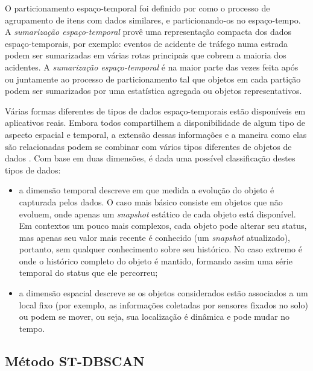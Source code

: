 O particionamento espaço-temporal foi definido por \cite{shekharetal2015} como o processo de agrupamento de itens com dados similares, e particionando-os no espaço-tempo. A \emph{sumarização espaço-temporal} provê uma representação compacta dos dados espaço-temporais, por exemplo: eventos de acidente de tráfego numa estrada podem ser sumarizadas em várias rotas principais que cobrem a maioria dos acidentes. A \emph{sumarização espaço-temporal} é na maior parte das vezes feita após ou juntamente ao processo de particionamento tal que objetos em cada partição podem ser sumarizados por uma estatística agregada ou objetos representativos.

Várias formas diferentes de tipos de dados espaço-temporais estão disponíveis em aplicativos reais. Embora todos compartilhem a disponibilidade de algum tipo de aspecto espacial e temporal, a extensão dessas informações e a maneira como elas são relacionadas podem se combinar com vários tipos diferentes de objetos de dados \cite{Kisilevich2009}. Com base em duas dimensões, é dada uma possível classificação destes tipos de dados:

\begin{itemize}
	\item a dimensão temporal descreve em que medida a evolução do objeto é capturada pelos dados. O caso mais básico consiste em objetos que não evoluem, onde apenas um \textit{snapshot} estático de cada objeto está disponível. Em contextos um pouco mais complexos, cada objeto pode alterar seu status, mas apenas seu valor mais recente é conhecido (um \textit{snapshot} atualizado), portanto, sem qualquer conhecimento sobre seu histórico. No caso extremo é onde o histórico completo do objeto é mantido, formando assim uma série temporal do status que ele percorreu;

	\item a dimensão espacial descreve se os objetos considerados estão associados a um local fixo (por exemplo, as informações coletadas por sensores fixados no solo) ou podem se mover, ou seja, sua localização é dinâmica e pode mudar no tempo.
\end{itemize}

\subsection{Método ST-DBSCAN}
\label{stdbscan}

